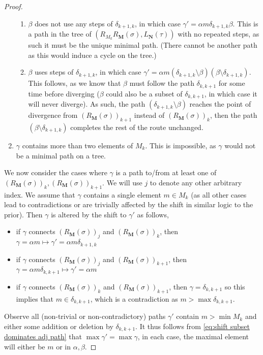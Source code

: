 \begin{proof}
\begin{enumerate}
    \begin{enumerate}
        \item $\beta$ does not use any steps of $\delta_{k+1,k}$, in which case $\gamma' = \alpha m \delta_{k+1,k} \beta$.
        This is a path in the tree of $(R_{M_k}R_{\mathbf{M}}(\sigma),L_{\mathbf{N}}(\tau))$ with no repeated steps, as such it must be the unique minimal path. 
        (There cannot be another path as this would induce a cycle on the tree.)
        \item $\beta$ uses steps of $\delta_{k+1,k}$, in which case $\gamma' = \alpha m (\delta_{k+1,k}\setminus \beta)(\beta \setminus \delta_{k+1,k})$. This follows, as we know that $\beta$ must follow the path $\delta_{k,k+1}$ for some time before diverging ($\beta$ could also be a subset of $\delta_{k,k+1}$, in which case it will never diverge). As such, the path $(\delta_{k+1,k}\setminus \beta)$ reaches the point of divergence from $(R_{\mathbf{M}}(\sigma))_{k+1}$ instead of $(R_{\mathbf{M}}(\sigma))_{k}$, then the path $(\beta \setminus \delta_{k+1,k})$ completes the rest of the route unchanged.
    \end{enumerate}
    \item $\gamma$ contains more than two elements of $M_k$. This is impossible, as $\gamma$ would not be a minimal path on a tree.
\end{enumerate}
We now consider the cases where $\gamma$ is a path to/from at least one of $(R_{\mathbf{M}}(\sigma))_k,(R_{\mathbf{M}}(\sigma))_{k+1}$. We will use $j$ to denote any other arbitrary index. We assume that $\gamma$ contains a single element $m\in M_k$ (as all other cases lead to contradictions or are trivially affected by the shift in similar logic to the prior). Then $\gamma$ is altered by the shift to $\gamma'$ as follows,
\begin{itemize}
    \item if $\gamma$ connects $(R_{\mathbf{M}}(\sigma))_j$ and $(R_{\mathbf{M}}(\sigma))_k$, then $\gamma = \alpha m \mapsto \gamma' = \alpha m \delta_{k+1,k} $
    \item if $\gamma$ connects $(R_{\mathbf{M}}(\sigma))_j$ and $(R_{\mathbf{M}}(\sigma))_{k+1}$, then $\gamma = \alpha m \delta_{k,k+1} \mapsto \gamma' = \alpha m $
    \item if $\gamma$ connects $(R_{\mathbf{M}}(\sigma))_k$ and $(R_{\mathbf{M}}(\sigma))_{k+1}$, then $\gamma = \delta_{k,k+1}$ so this implies that $m\in \delta_{k,k+1}$, which is a contradiction as $m> \max \delta_{k,k+1}$.
\end{itemize}
Observe all (non-trivial or non-contradictory) paths $\gamma'$ contain $m>\min M_k$ and either some addition or deletion by $\delta_{k,k+1}$. It thus follows from \cref{eq:shift subset dominates adj path} that $\max \gamma' = \max \gamma$, in each case, the maximal element will either be $m$ or in $\alpha,\beta$.
\end{proof}
